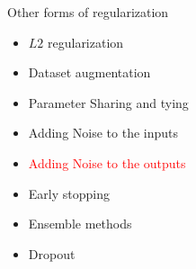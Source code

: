 \begin{frame}
\end{frame}

\begin{frame}
	\vspace{4em}
	\begin{overlayarea}{\textwidth}{\textheight}
		\begin{block}{Other forms of regularization}
			\begin{itemize}
				\item $L2$ regularization
				\item Dataset augmentation
				\item Parameter Sharing and tying
				\item Adding Noise to the inputs
				\item \textcolor<1->{red}{Adding Noise to the outputs}
				\item Early stopping
				\item Ensemble methods
				\item Dropout
			\end{itemize}
		\end{block}
	\end{overlayarea}
\end{frame}
			
